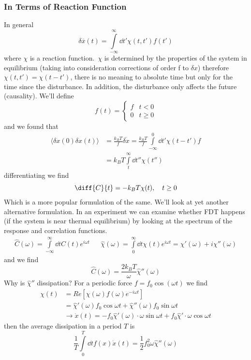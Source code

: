 \subsubsection{In Terms of Reaction Function}
In general
\begin{equation}
	\delta \overline{x}(t) = \int\limits_{-\infty}^\infty \dd t' \chi (t,t') f(t')
\end{equation}
where \(\chi \) is a reaction function.\  \(\chi \) is determined by the properties of the system in equilibrium (taking into consideration corrections of order f to \(\delta x\)) therefore \(\chi(t,t') = \chi(t-t')\), there is no meaning to absolute time but only for the time since the disturbance. In addition, the disturbance only affects the future (causality). We'll define
\begin{equation}
	f(t) = \begin{cases}
		f & t<0\\
		0 & t \geq 0
	\end{cases}
\end{equation}
and we found that
\begin{align}
	\langle \delta x(0)\delta x(t)\rangle &= \frac{k_B T}{f}\overline{\delta x} = \frac{k_B T}{f}\int\limits_{-\infty}^0\dd t' \chi(t-t') f\\
	&= k_B T\int\limits_t^\infty\dd t'' \chi(t'')
\end{align}
differentiating we find
\begin{equation}
	\diff{C}{t} = - k_B T\chi(t),\quad t\geq 0
\end{equation}
Which is a more popular formulation of the same. We'll look at yet another alternative formulation. In an experiment we can examine whether FDT happens (if the system is near thermal equilibrium) by looking at the spectrum of the response and correlation functions.
\begin{align}
	\hat C(\omega) = \int\limits_{-\infty}^{\infty}\dd t C(t)e^{i\omega t} && \hat \chi (\omega) = \int\limits_0^\infty \dd t\chi(t)e^{i\omega t} = \chi'(\omega) + i\chi''(\omega)
\end{align}
and we find
\begin{equation}
	\hat C(\omega) = \frac{2k_B T}{\omega}\hat\chi''(\omega)
\end{equation}
Why is \(\hat\chi''\) dissipation? For a periodic force \(f = f_0\cos(\omega t)\) we find
\begin{align}
	\chi (t) &= Re[\chi(\omega)f(\omega)e^{-i\omega t}]\\
	&= \hat \chi'(\omega)f_0\cos\omega t+\hat\chi''(\omega)f_0\sin\omega t\\
	&\rightarrow \dot x(t) = -f_0\hat\chi'(\omega)\cdot\omega\sin\omega t+f_0\hat\chi'\cdot\omega\cos\omega t
\end{align}
then the average dissipation in a period \(T\) is
\begin{equation}
	\frac{1}{T}\int\limits_0^T\dd t f(x)\dot x(t) = \frac{1}{2}f_0^2\omega\hat\chi''(\omega)
\end{equation}